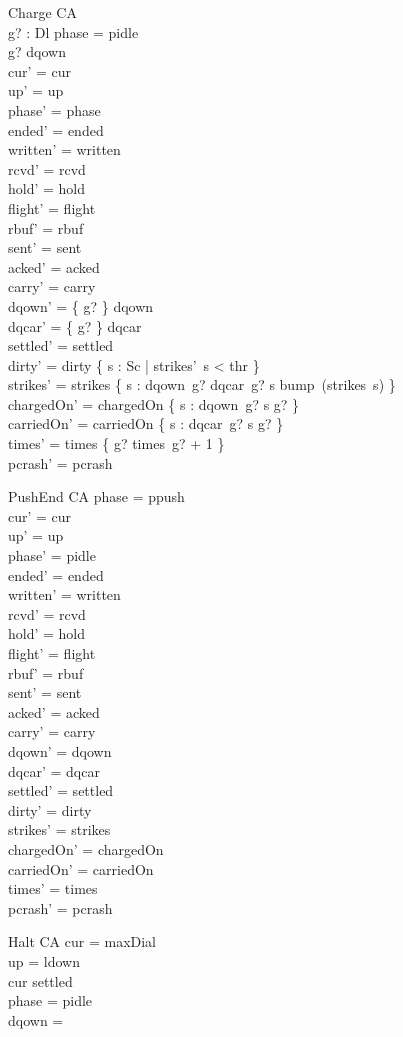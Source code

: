 \documentclass[a4paper,10pt,fleqn]{article}
\begin{document}
\begin{schema}{Charge}
  \Delta CA \\
  g? : Dl
\where
  phase = pidle \\
  g? \in \dom dqown \\
  cur' = cur \\
  up' = up \\
  phase' = phase \\
  ended' = ended \\
  written' = written \\
  rcvd' = rcvd \\
  hold' = hold \\
  flight' = flight \\
  rbuf' = rbuf \\
  sent' = sent \\
  acked' = acked \\
  carry' = carry \\
  dqown' = \{ g? \} \ndres dqown \\
  dqcar' = \{ g? \} \ndres dqcar \\
  settled' = settled \\
  dirty' = dirty \cap \{ s : Sc | strikes'~s < thr \} \\
  strikes' = strikes \oplus \{ s : dqown~g? \cup dqcar~g? \spot s \mapsto bump~(strikes~s) \} \\
  chargedOn' = chargedOn \cup \{ s : dqown~g? \spot s \mapsto g? \} \\
  carriedOn' = carriedOn \cup \{ s : dqcar~g? \spot s \mapsto g? \} \\
  times' = times \oplus \{ g? \mapsto times~g? + 1 \} \\
  pcrash' = pcrash
\end{schema}

\begin{schema}{PushEnd}
  \Delta CA
\where
  phase = ppush \\
  cur' = cur \\
  up' = up \\
  phase' = pidle \\
  ended' = ended \\
  written' = written \\
  rcvd' = rcvd \\
  hold' = hold \\
  flight' = flight \\
  rbuf' = rbuf \\
  sent' = sent \\
  acked' = acked \\
  carry' = carry \\
  dqown' = dqown \\
  dqcar' = dqcar \\
  settled' = settled \\
  dirty' = dirty \\
  strikes' = strikes \\
  chargedOn' = chargedOn \\
  carriedOn' = carriedOn \\
  times' = times \\
  pcrash' = pcrash
\end{schema}

\begin{schema}{Halt}
  \Xi CA
\where
  cur = maxDial \\
  up = ldown \\
  cur \in settled \\
  phase = pidle \\
  dqown = \emptyset
\end{schema}
\end{document}
